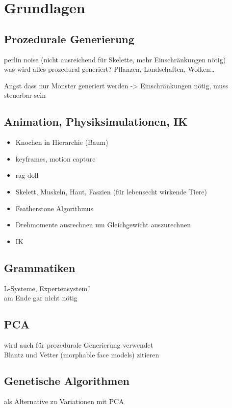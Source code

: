 \chapter{Grundlagen}

\section{Prozedurale Generierung}

perlin noise (nicht ausreichend für Skelette, mehr Einschränkungen nötig)\\
was wird alles prozedural generiert? Pflanzen, Landschaften, Wolken\dots

Angst dass nur Monster generiert werden -> Einschränkungen nötig, muss steuerbar sein


\section{Animation, Physiksimulationen, IK}

\begin{itemize}
 \item Knochen in Hierarchie (Baum)
 \item keyframes, motion capture
 \item rag doll
 \item Skelett, Muskeln, Haut, Faszien (für lebensecht wirkende Tiere)
 \item Featherstone Algorithmus
 \item Drehmomente ausrechnen um Gleichgewicht auszurechnen
 \item IK
\end{itemize}


\section{Grammatiken}

L-Systeme, Expertensystem?\\
am Ende gar nicht nötig


\section{PCA}

wird auch für prozedurale Generierung verwendet\\
Blantz und Vetter (morphable face models) zitieren


\section{Genetische Algorithmen}

als Alternative zu Variationen mit PCA

